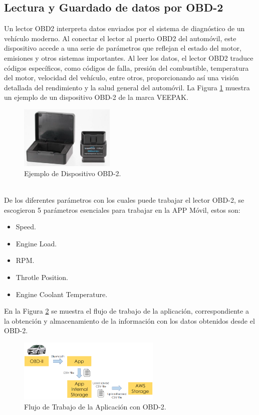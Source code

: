 \documentclass[a4paper,10pt, oneside, titlepage]{article}
\begin{document}
	\subsection{Lectura y Guardado de datos por OBD-2}\label{Eltiqueta_Lectura_Guardado_OBD-2}
	Un lector OBD2 interpreta datos enviados por el sistema de diagnóstico de un vehículo moderno. Al conectar el lector al puerto OBD2 del automóvil, este dispositivo accede a una serie de parámetros que reflejan el estado del motor, emisiones y otros sistemas importantes. Al leer los datos, el lector OBD2 traduce códigos específicos, como códigos de falla, presión del combustible, temperatura del motor, velocidad del vehículo, entre otros, proporcionando así una visión detallada del rendimiento y la salud general del automóvil. La Figura \ref{Ejemplo_Dispositivo_OBD} muestra un ejemplo de un dispositivo OBD-2 \cite{CONUEE} de la marca VEEPAK.
	\begin{figure}[!h]
		\centering
		\includegraphics[width = 0.45\linewidth, height = 3cm]{Ejemplo_Dispositivo_OBD.png}
		\caption{Ejemplo de Dispositivo OBD-2.}
		\label{Ejemplo_Dispositivo_OBD}
	\end{figure} \\
	\indent De los diferentes parámetros con los cuales puede trabajar el lector OBD-2, se escogieron 5 parámetros esenciales para trabajar en la APP Móvil, estos son:
	\begin{itemize}
		\item Speed.
		\item Engine Load.
		\item RPM.
		\item Throtle Position.
		\item Engine Coolant Temperature.
	\end{itemize}
	\indent\indent En la Figura \ref{Flujo_Trabajo_OBD2} se muestra el flujo de trabajo de la aplicación, correspondiente a la obtención y almacenamiento de la información con los datos obtenidos desde el OBD-2.
	\begin{figure}[!h]
		\centering
		\includegraphics[width = 1\linewidth, height = 3cm]{Flujo_Trabajo_OBD2.png}
		\caption{Flujo de Trabajo de la Aplicación con OBD-2.}
		\label{Flujo_Trabajo_OBD2}
	\end{figure} \\
\end{document}
